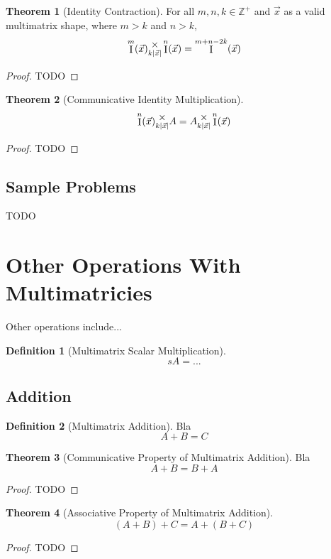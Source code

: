 \documentclass[12pt]{article}
\theoremstyle{definition}
\newtheorem{definition}{Definition}[section]
\newtheorem{theorem}{Theorem}[section]
\theoremstyle{case}
\theoremstyle{ppart}
\DeclareMathOperator{\Ident}{I}
\newcommand{\mmult}[1]{\text{\raisebox{1ex}{$\underset{#1}{\times}$}}}
\begin{document}
\begin{theorem}[Identity Contraction]
For all $m, n, k \in \mathbb{Z}^+$ and $\vec{x}$ as a valid multimatrix shape,
where $m > k$ and $n > k$,
\[ \Ident^m(\vec{x}) \mmult{k|\vec{x}|} \Ident^n(\vec{x}) = \Ident^{m+n-2k}(\vec{x}) \]
\end{theorem}
\begin{proof}
TODO
\end{proof}

\begin{theorem}[Communicative Identity Multiplication]
\[ \Ident^n(\vec{x}) \mmult{k|\vec{x}|} A = A \mmult{k|\vec{x}|} \Ident^n(\vec{x}) \]
\end{theorem}
\begin{proof}
TODO
\end{proof}

\subsection*{Sample Problems}
TODO

\section{Other Operations With Multimatricies}
Other operations include...

\begin{definition}[Multimatrix Scalar Multiplication]
\[ sA = ...\]
\end{definition}

\subsection{Addition}

\begin{definition}[Multimatrix Addition]
Bla
\[ A + B = C \]
\end{definition}

\begin{theorem}[Communicative Property of Multimatrix Addition]
Bla
\[ A + B = B + A \]
\end{theorem}
\begin{proof}
TODO
\end{proof}

\begin{theorem}[Associative Property of Multimatrix Addition]
\[ (A + B) + C = A + (B + C) \]
\end{theorem}
\begin{proof}
TODO
\end{proof}
\end{document}
